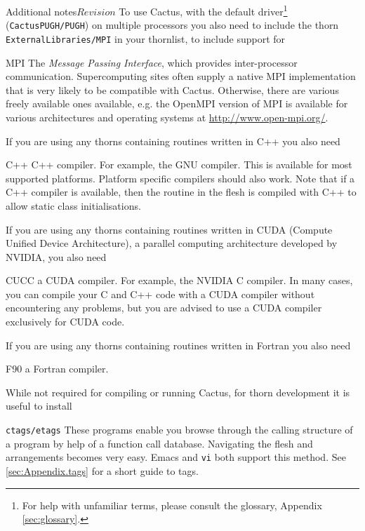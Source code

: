 \begin{cactuspart}{Additional notes}{}{$Revision$}
\noindent
To use Cactus, with the default driver\footnote{For help with unfamiliar terms,
please consult the glossary, Appendix \ref{sec:glossary}.}
(\texttt{CactusPUGH/PUGH}) on multiple
processors you also need to include the thorn \texttt{ExternalLibraries/MPI}
in your thornlist, to include support for
\begin{Lentry}
\item[MPI] The \textit{Message Passing Interface},
which provides inter-processor communication.
Supercomputing sites often supply a native MPI implementation
that is very likely to be compatible with Cactus. Otherwise, there are
various freely available ones available, e.g. the OpenMPI
version of MPI is available for various architectures and operating
systems at \url{http://www.open-mpi.org/}.
\end{Lentry}

\noindent
If you are using any thorns containing routines
written in C++ you also need
\begin{Lentry}
\item[C++] C++ compiler. For example, the GNU compiler. This
 is available for most supported platforms.  Platform specific compilers
 should also work.  Note that if a C++ compiler is available, then the
  routine in the flesh is compiled with C++ to allow static
 class initialisations.
\end{Lentry}

\noindent
If you are using any thorns containing routines
written in CUDA (Compute Unified Device Architecture), a parallel 
computing architecture developed by NVIDIA, you also need
\begin{Lentry}
\item[CUCC] a CUDA compiler. For example, the NVIDIA C compiler. In many
cases, you can compile your C and C++ code with a CUDA compiler without 
encountering any problems, but you are advised to use a CUDA compiler exclusively
for CUDA code.
\end{Lentry}

\noindent
If you are using any thorns containing routines
written in Fortran you also need
\begin{Lentry}
\item[F90] a Fortran compiler.
\end{Lentry}

\noindent
While not required for compiling or running Cactus, for thorn development
it is useful to install
\begin{Lentry}
\item[\texttt{ctags/etags}] These programs enable you browse through the
  calling structure of a program by help of a function call database.
  Navigating the flesh and arrangements becomes very easy. Emacs and
  \texttt{vi} both support this method. See \ref{sec:Appendix.tags} for a short
  guide to tags.
\end{Lentry}


\end{cactuspart}

